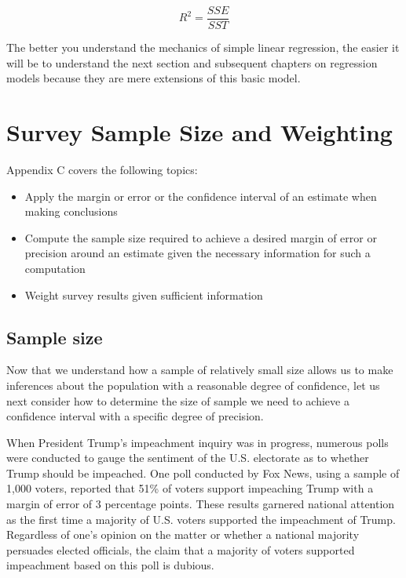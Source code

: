 \documentclass[
]{book}
\providecommand{\tightlist}{%
  \setlength{\itemsep}{0pt}\setlength{\parskip}{0pt}}
\begin{document}
\begin{equation}
R^2 = {\frac{SSE}{SST}}
\label{eq:r2}
\end{equation}

The better you understand the mechanics of simple linear regression, the easier it will be to understand the next section and subsequent chapters on regression models because they are mere extensions of this basic model.

\hypertarget{appendixD}{%
\chapter{Survey Sample Size and Weighting}\label{appendixD}}

Appendix C covers the following topics:

\begin{itemize}
\tightlist
\item
  Apply the margin or error or the confidence interval of an estimate when making conclusions
\item
  Compute the sample size required to achieve a desired margin of error or precision around an estimate given the necessary information for such a computation
\item
  Weight survey results given sufficient information
\end{itemize}

\hypertarget{sample-size}{%
\section{Sample size}\label{sample-size}}

Now that we understand how a sample of relatively small size allows us to make inferences about the population with a reasonable degree of confidence, let us next consider how to determine the size of sample we need to achieve a confidence interval with a specific degree of precision.

When President Trump's impeachment inquiry was in progress, numerous polls were conducted to gauge the sentiment of the U.S. electorate as to whether Trump should be impeached. One poll conducted by Fox News, using a sample of 1,000 voters, reported that 51\% of voters support impeaching Trump with a margin of error of 3 percentage points. These results garnered national attention as the first time a majority of U.S. voters supported the impeachment of Trump. Regardless of one's opinion on the matter or whether a national majority persuades elected officials, the claim that a majority of voters supported impeachment based on this poll is dubious.
\end{document}
